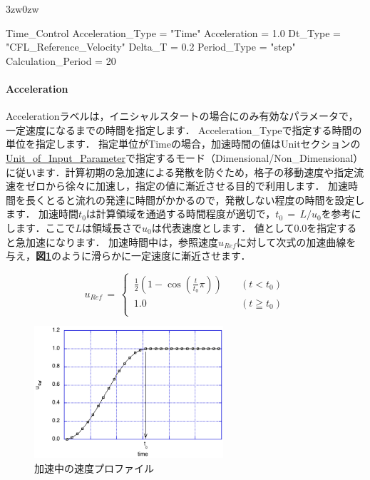 \begin{indentation}{3zw}{0zw}

{\small
\begin{program}
  Time_Control {
    Acceleration_Type  = "Time"
    Acceleration       = 1.0
    Dt_Type            = "CFL_Reference_Velocity"
    Delta_T            = 0.2
    Period_Type        = "step"
    Calculation_Period = 20
  }
\end{program}
}

%
\paragraph{Acceleration}
Accelerationラベルは，イニシャルスタートの場合にのみ有効なパラメータで，一定速度になるまでの時間を指定します．
Acceleration\_Typeで指定する時間の単位を指定します．
指定単位がTimeの場合，加速時間の値はUnitセクションの\hyperlink{tgt:unit}{Unit\_of\_Input\_Parameter}で指定するモード（Dimensional/Non\_Dimensional）に従います．計算初期の急加速による発散を防ぐため，格子の移動速度や指定流速をゼロから徐々に加速し，指定の値に漸近させる目的で利用します．
加速時間を長くとると流れの発達に時間がかかるので，発散しない程度の時間を設定します．
加速時間$t_0$は計算領域を通過する時間程度が適切で，$t_0\,=\,L/u_0$を参考にします．ここで$L$は領域長さで$u_0$は代表速度とします．
値として0.0を指定すると急加速になります．
加速時間中は，参照速度$u_{Ref}$に対して次式の加速曲線を与え，\textbf{図\ref{fig:accel_velocity}}のように滑らかに一定速度に漸近させます．

\begin{equation}
u_{Ref}\,=\,
\begin{cases}
\, \displaystyle {\frac{1}{2}}\left(1-\cos \left( \frac{t}{t_{0}}\pi \right) \right) & \quad (t < t_{0})\\
\, 1.0 & \quad (t \geqq t_{0})\\
\end{cases}
\label{eq:Ref_velocity_eq}
\end{equation}

\begin{figure}[htdp]
\begin{center}
\includegraphics[width=7cm,clip]{accel_Velocity.eps}
\end{center}
\caption{加速中の速度プロファイル}
\label{fig:accel_velocity}
\end{figure}


\end{indentation}
